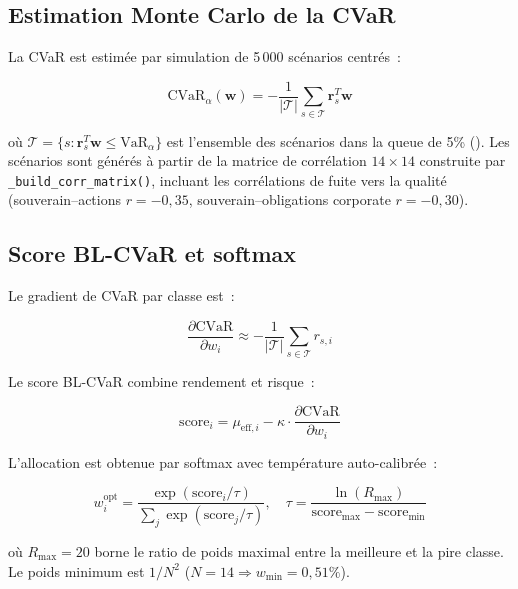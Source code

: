 \documentclass[12pt, a4paper, twoside, openright]{report}
\theoremstyle{definition}
\begin{document}
\subsection{Estimation Monte Carlo de la CVaR}

La CVaR est estimée par simulation de 5\,000 scénarios centrés~:

\begin{equation}
\text{CVaR}_\alpha(\mathbf{w}) = -\frac{1}{|\mathcal{T}|} \sum_{s \in \mathcal{T}} \mathbf{r}_s^T \mathbf{w}
\label{eq:cvar-mc}
\end{equation}

\noindent où $\mathcal{T} = \{s : \mathbf{r}_s^T \mathbf{w} \leq \text{VaR}_\alpha\}$ est l'ensemble des scénarios dans la queue de 5\% (\citealt{rockafellar2000}). Les scénarios sont générés à partir de la matrice de corrélation $14 \times 14$ construite par \texttt{\_build\_corr\_matrix()}, incluant les corrélations de fuite vers la qualité (souverain--actions $r = -0{,}35$, souverain--obligations corporate $r = -0{,}30$).

\subsection{Score BL-CVaR et softmax}

Le gradient de CVaR par classe est~:

\begin{equation}
\frac{\partial \text{CVaR}}{\partial w_i} \approx -\frac{1}{|\mathcal{T}|} \sum_{s \in \mathcal{T}} r_{s,i}
\label{eq:cvar-gradient}
\end{equation}

Le score BL-CVaR combine rendement et risque~:

\begin{equation}
\text{score}_i = \mu_{\text{eff},i} - \kappa \cdot \frac{\partial \text{CVaR}}{\partial w_i}
\label{eq:blcvar-score}
\end{equation}

L'allocation est obtenue par softmax avec température auto-calibrée~:

\begin{equation}
w_i^{\text{opt}} = \frac{\exp(\text{score}_i / \tau)}{\sum_j \exp(\text{score}_j / \tau)}, \quad
\tau = \frac{\ln(R_{\max})}{\text{score}_{\max} - \text{score}_{\min}}
\label{eq:softmax-blcvar}
\end{equation}

\noindent où $R_{\max} = 20$ borne le ratio de poids maximal entre la meilleure et la pire classe. Le poids minimum est $1/N^2$ ($N = 14 \Rightarrow w_{\min} = 0{,}51\%$).
\end{document}
